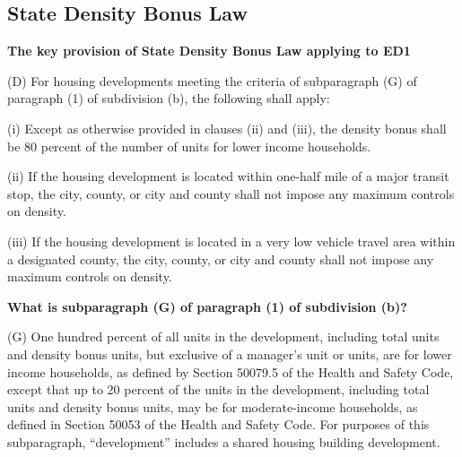 \documentclass[12pt]{article}
\theoremstyle{definition}
\begin{document}
\subsection{State Density Bonus Law}
\textbf{The key provision of State Density Bonus Law applying to ED1}

(D) For housing developments meeting the criteria of subparagraph (G) of paragraph (1) of subdivision (b), the following shall apply:

(i) Except as otherwise provided in clauses (ii) and (iii), the density bonus shall be 80 percent of the number of units for lower income households.

(ii) If the housing development is located within one-half mile of a major transit stop, the city, county, or city and county shall not impose any maximum controls on density.

(iii) If the housing development is located in a very low vehicle travel area within a designated county, the city, county, or city and county shall not impose any maximum controls on density.

\textbf{What is subparagraph (G) of paragraph (1) of subdivision (b)?}

(G) One hundred percent of all units in the development, including total units and density bonus units, but exclusive of a manager’s unit or units, are for lower income households, as defined by Section 50079.5 of the Health and Safety Code, except that up to 20 percent of the units in the development, including total units and density bonus units, may be for moderate-income households, as defined in Section 50053 of the Health and Safety Code. For purposes of this subparagraph, “development” includes a shared housing building development.
\end{document}
